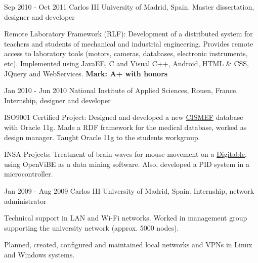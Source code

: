 \experience
  {Sep 2010 - Oct 2011}
  {Carlos III University of Madrid, Spain.}
  {Master dissertation, designer and developer}
  {\vspace{-1em}\begin{rlist}
    \item Remote Laboratory Framework (RLF): Development of a distributed
    system for teachers and students of mechanical and industrial
    engineering. Provides remote access to laboratory tools (motors,
    cameras, databases, electronic instruments, etc).
    Implemented using JavaEE, C and Visual C++,
    Android, HTML \& CSS, JQuery and WebServices.
    \textbf{Mark: A+ with honors}
  \end{rlist}}

\experience
  {Jan 2010 - Jun 2010}
  {National Institute of Applied Sciences, Rouen, France.}
  {Internship, designer and developer}
  {\vspace{-1em}\begin{rlist}
    \item ISO9001 Certified Project: Designed and developed a new \href{http://www.cismef.org}{CISMEF}
    database with Oracle 11g. Made a RDF framework for the medical database, worked as 
    design manager. Taught Oracle 11g to the students workgroup.
    \item INSA Projects: Treatment of brain waves for mouse movement on a \href{http://digitable.imag.fr/}{Digitable},
    using OpenViBE as a data mining software. Also, developed a PID system in a microcontroller. 
  \end{rlist}}

\experience
  {Jan 2009 - Aug 2009}
  {Carlos III University of Madrid, Spain.}
  {Internship, network administrator}
  {\vspace{-1em}\begin{rlist}
    \item Technical support in LAN and Wi-Fi networks. Worked in management
    group supporting the university network (approx. 5000 nodes).
    \item Planned, created, configured and maintained local networks and
    VPNs in Linux and Windows systems.
  \end{rlist}}
